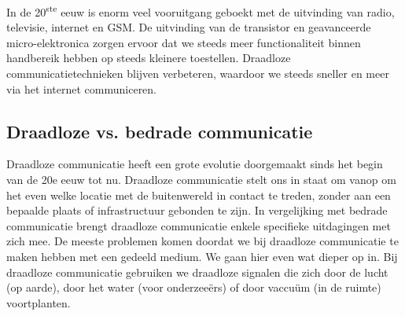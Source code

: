  In de 20\textsuperscript{ste} eeuw is enorm veel vooruitgang geboekt met de uitvinding van radio, televisie, internet en GSM. De uitvinding van de transistor en geavanceerde micro-elektronica zorgen ervoor dat we steeds meer functionaliteit binnen handbereik hebben op steeds kleinere toestellen. Draadloze communicatietechnieken blijven verbeteren, waardoor we steeds sneller en meer via het internet communiceren. 

 \subsection{Draadloze vs. bedrade communicatie}
 Draadloze communicatie heeft een grote evolutie doorgemaakt sinds het begin van de 20e eeuw tot nu. Draadloze communicatie stelt ons in staat om vanop om het even welke locatie met de buitenwereld in contact te treden, zonder aan een bepaalde plaats of infrastructuur gebonden te zijn.
 In vergelijking met bedrade communicatie brengt draadloze communicatie enkele specifieke uitdagingen met zich mee. De meeste problemen komen doordat we bij draadloze communicatie te maken hebben met een gedeeld medium. We gaan hier even wat dieper op in. Bij draadloze communicatie gebruiken we draadloze signalen die zich door de lucht (op aarde), door het water (voor onderzee\"ers) of door vaccu\"um (in de ruimte) voortplanten.


